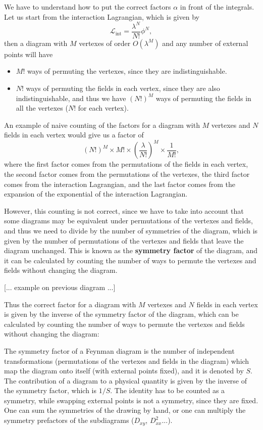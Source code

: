 We have to understand how to put the correct factors \(\alpha\) in front of the integrals. Let us start from the interaction Lagrangian, which is given by
\[
    \mathcal{L}_{\text{int}} = \frac{\lambda^N}{N!} \phi^N,
\]
then a diagram with \(M\) vertexes of order \(O(\lambda^M)\) and any number of external points will have
\begin{itemize}
    \item \(M!\) ways of permuting the vertexes, since they are indistinguishable.
    \item \(N!\) ways of permuting the fields in each vertex, since they are also indistinguishable, and thus we have \((N!)^M\) ways of permuting the fields in all the vertexes (\(N!\) for each vertex).
\end{itemize}
An example of naive counting of the factors for a diagram with \(M\) vertexes and \(N\) fields in each vertex would give us a factor of
\[
    (N!)^M \times M! \times (\frac{\lambda}{N!})^M \times \frac{1}{M!},
\]
where the first factor comes from the permutations of the fields in each vertex, the second factor comes from the permutations of the vertexes, the third factor comes from the interaction Lagrangian, and the last factor comes from the expansion of the exponential of the interaction Lagrangian.

However, this counting is not correct, since we have to take into account that some diagrams may be equivalent under permutations of the vertexes and fields, and thus we need to divide by the number of symmetries of the diagram, which is given by the number of permutations of the vertexes and fields that leave the diagram unchanged. This is known as the \textbf{symmetry factor} of the diagram, and it can be calculated by counting the number of ways to permute the vertexes and fields without changing the diagram.

    [... example on previous diagram ...]

Thus the correct factor for a diagram with \(M\) vertexes and \(N\) fields in each vertex is given by the inverse of the symmetry factor of the diagram, which can be calculated by counting the number of ways to permute the vertexes and fields without changing the diagram:
\begin{definition}
    The symmetry factor of a Feynman diagram is the number of independent transformations (permutations of the vertexes and fields in the diagram) which map the diagram onto itself (with external points fixed), and it is denoted by \(S\). The contribution of a diagram to a physical quantity is given by the inverse of the symmetry factor, which is \(1/S\). The identity has to be counted as a symmetry, while swapping external points is not a symmetry, since they are fixed. One can sum the symmetries of the drawing by hand, or one can multiply the symmetry prefactors of the subdiagrams (\(D_{xy}\), \(D_{xx}^2\)...).
\end{definition}

